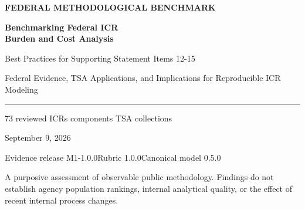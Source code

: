 \begin{titlepage}
\thispagestyle{empty}
\raggedright
\vspace*{0.4in}
{\sffamily\small\bfseries\color{Teal} FEDERAL METHODOLOGICAL BENCHMARK\par}
\vspace{0.35in}
{\sffamily\fontsize{29}{34}\selectfont\bfseries\color{Navy} Benchmarking Federal ICR\\[4pt] Burden and Cost Analysis\par}
\vspace{0.25in}
{\sffamily\fontsize{18}{23}\selectfont\color{Navy} Best Practices for Supporting Statement Items 12-15\par}
\vspace{0.35in}
{\fontsize{13}{18}\selectfont Federal Evidence, TSA Applications, and Implications for Reproducible ICR Modeling\par}
\vspace{0.5in}
{\color{Teal}\rule{\textwidth}{1.4pt}}
\vspace{0.25in}
{\sffamily\large 73 reviewed ICRs\quad\textbar{} components\quad\textbar{} TSA collections\par}
\vfill
{\sffamily\small September 9, 2026\par}
\vspace{0.15in}
{\small Evidence release M1-1.0.0\quad Rubric 1.0.0\quad Canonical model 0.5.0\par}
\vspace{0.2in}
{\small A purposive assessment of observable public methodology. Findings do not establish agency population rankings, internal analytical quality, or the effect of recent internal process changes.\par}
\end{titlepage}
{\small\setcounter{tocdepth}{1}\tableofcontents}
\clearpage
{}
